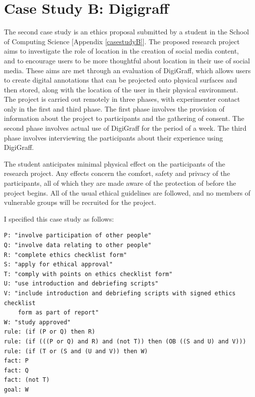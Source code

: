 \documentclass{l4proj}
\begin{document}
\section{Case Study B: Digigraff}
The second case study is an ethics proposal submitted by a student in the School of Computing Science [Appendix \ref{casestudyB}]. The proposed research project aims to investigate the role of location in the creation of social media content, and to encourage users to be more thoughtful about location in their use of social media. These aims are met through an evaluation of DigiGraff, which allows users to create digital annotations that can be projected onto physical surfaces and then stored, along with the location of the user in their physical environment. The project is carried out remotely in three phases, with experimenter contact only in the first and third phase. The first phase involves the provision of information about the project to participants and the gathering of consent. The second phase involves actual use of DigiGraff for the period of a week. The third phase involves interviewing the participants about their experience using DigiGraff. 

The student anticipates minimal physical effect on the participants of the research project. Any effects concern the comfort, safety and privacy of the participants, all of which they are made aware of the protection of before the project begins. All of the usual ethical guidelines are followed, and no members of vulnerable groups will be recruited for the project. 

I specified this case study as follows: 
\begin{verbatim}
P: "involve participation of other people"
Q: "involve data relating to other people"
R: "complete ethics checklist form"
S: "apply for ethical approval"
T: "comply with points on ethics checklist form"
U: "use introduction and debriefing scripts"
V: "include introduction and debriefing scripts with signed ethics checklist 
    form as part of report"
W: "study approved"
rule: (if (P or Q) then R)
rule: (if (((P or Q) and R) and (not T)) then (OB ((S and U) and V)))
rule: (if (T or (S and (U and V)) then W)
fact: P
fact: Q
fact: (not T)
goal: W
\end{verbatim}
\end{document}

